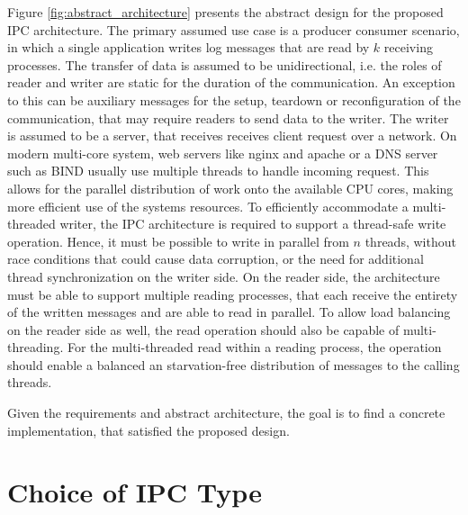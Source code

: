 Figure \ref{fig:abstract_architecture} presents the abstract design for the proposed \ac{IPC} architecture.
The primary assumed use case is a producer consumer scenario, in which a single application writes log messages that 
are read by $k$ receiving processes. The transfer of data is assumed to be unidirectional, i.e. the roles of reader and writer are static for the duration of the
communication. An exception to this can be auxiliary messages for the setup, teardown or reconfiguration of the communication, that may require readers to send
data to the writer. The writer is assumed to be a server, that receives receives client request over a network.
On modern multi-core system, web servers like nginx and apache or a DNS server such as BIND usually use multiple threads to handle incoming request.
This allows for the parallel distribution of work onto the available CPU cores, making more efficient use of the systems resources. To efficiently accommodate a 
multi-threaded writer, the \ac{IPC} architecture is required to support a thread-safe write operation. Hence, it must be possible to
write in parallel from $n$ threads, without race conditions that could cause data corruption, or the need for additional thread synchronization    
on the writer side. On the reader side, the architecture must be able to support multiple reading processes, that each receive the entirety
of the written messages and are able to read in parallel. To allow load balancing on the reader side as well, the read operation
should also be capable of multi-threading. For the multi-threaded read within a reading process, the operation should enable a balanced an starvation-free distribution 
of messages to the calling threads.  
\par
Given the requirements and abstract architecture, the goal is to find a concrete implementation, that satisfied the proposed design.


\section{Choice of IPC Type}

